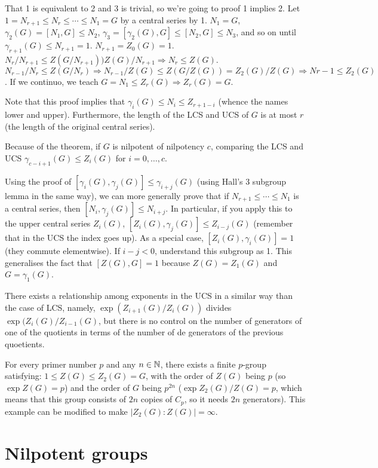 \documentclass[twoside, 11pt]{article}
\begin{document}
\begin{dem}
That 1 is equivalent to 2 and 3 is trivial, so we're going to proof 1 implies 2. Let $1=N_{r+1}\leq N_r\leq \cdots \leq N_1=G$ by a central series by 1. $N_1=G$, $\gamma_2(G)=[N_1,G]\leq N_2$, $\gamma_3=[\gamma_2(G),G]\leq [N_2,G]\leq N_3$, and so on until $\gamma_{r+1}(G)\leq N_{r+1}=1$. $N_{r+1}=Z_0(G)=1$. $N_r/N_{r+1}\leq Z(G/N_{r+1}))Z(G)/N_{r+1}\Rightarrow N_r\leq Z(G)$. $N_{r-1}/N_r\leq Z(G/N_r)\Rightarrow N_{r-1}/Z(G)\leq  Z(G/Z(G))=Z_2(G)/Z(G)\Rightarrow N{r-1}\leq Z_2(G)$. If we continuo, we teach $G=N_1\leq Z_r(G)\Rightarrow Z_r(G)=G$. 
\end{dem}

Note that this proof implies that $\gamma_{i}(G)\leq N_i\leq Z_{r+1-i}$ (whence the names lower and upper). Furthermore, the length of the LCS and UCS of $G$ is at most $r$ (the length of the original central series).

Because of the theorem, if $G$ is nilpotent of nilpotency $c$, comparing the LCS and UCS $\gamma_{c-i+1}(G)\leq Z_i(G)$ for $i=0,\dots, c$.

Using the proof of $[\gamma_i(G),\gamma_j(G)]\leq \gamma_{i+j}(G)$ (using Hall's 3 subgroup lemma in the same way), we can more generally prove that if $N_{r+1}\leq\cdots\leq N_1$ is a central series, then  $[N_i,\gamma_j(G)]\leq N_{i+j}$. In particular, if you apply this to the upper central series $Z_i(G)$, $[Z_i(G), \gamma_j(G)]\leq Z_{i-j}(G)$ (remember that in the UCS the index goes up). As a special case, $[Z_i(G),\gamma_i(G)]=1$ (they commute elementwise). If $i-j<0$, understand this subgroup as 1. This generalises the fact that $[Z(G),G]=1$ because $Z(G)=Z_1(G)$ and $G=\gamma_1(G)$. 

There exists a relationship among exponents in the UCS in a similar way than the case of LCS, namely, $\exp(Z_{i+1}(G)/Z_i(G))$ divides $\exp(Z_i(G)/Z_{i-1}(G)$, but there is no control on the number of generators of one of the quotients in terms of the number of de generators of the previous quoetients. 

For every primer number $p$ and any $n\in\mathbb{N}$, there exists a finite $p$-group satisfying: $1\leq Z(G)\leq Z_2(G)=G$, with the order of $Z(G)$ being $p$ (so $\exp Z(G)=p$) and the order of $G$ being $p^{2n}$ ($\exp Z_2(G)/Z(G)=p$, which means that this group consists of $2n$ copies of $C_p$, so it needs $2n$ generators). This example can be modified to make $|Z_2(G):Z(G)|=\infty$. 

\section{Nilpotent groups}
\end{document}
